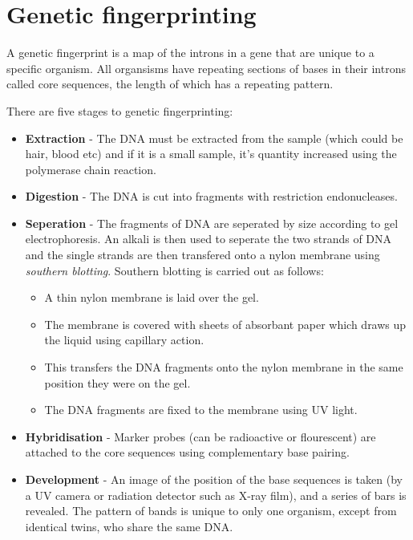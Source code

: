 \documentclass{article}
\begin{document}
\section*{Genetic fingerprinting}

A genetic fingerprint is a map of the introns in a gene that are unique to a
specific organism. All organsisms have repeating sections of bases in their
introns called core sequences, the length of which has a repeating pattern.

There are five stages to genetic fingerprinting:

\begin{itemize}

	\item {\bf Extraction} - The DNA must be extracted from the sample (which
	could be hair, blood etc) and if it is a small sample, it's quantity
	increased using the polymerase chain reaction.

	\item {\bf Digestion} - The DNA is cut into fragments with restriction
	endonucleases.

	\item {\bf Seperation} - The fragments of DNA are seperated by size
	according to gel electrophoresis. An alkali is then used to seperate the two
	strands of DNA and the single strands are then transfered onto a nylon
	membrane using {\it southern blotting}. Southern blotting is carried out as
	follows:

	\begin{itemize}

		\item A thin nylon membrane is laid over the gel.

		\item The membrane is covered with sheets of absorbant paper which draws
		up the liquid using capillary action.

		\item This transfers the DNA fragments onto the nylon membrane in the
		same position they were on the gel.

		\item The DNA fragments are fixed to the membrane using UV light.		

	\end{itemize}

	\item {\bf Hybridisation} - Marker probes (can be radioactive or
	flourescent) are attached to the core sequences using complementary base
	pairing.


	\item {\bf Development} - An image of the position of the base sequences is
	taken (by a UV camera or radiation detector such as X-ray film), and a
	series of bars is revealed. The pattern of bands is unique to only one
	organism, except from identical twins, who share the same DNA.

\end{itemize}
\end{document}
